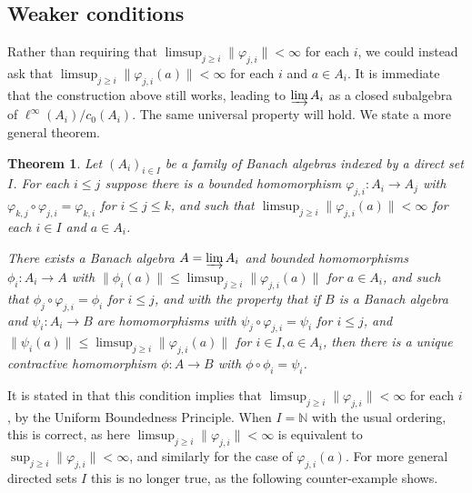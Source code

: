 \documentclass[a4paper,11pt]{article}
\newcommand{\indlim}{\varinjlim}
\newtheorem{theorem}[lemma]{Theorem}
\theoremstyle{definition}
\begin{document}
\subsection{Weaker conditions}

Rather than requiring that $\limsup_{j\geq i} \|\varphi_{j,i}\| < \infty$ for each $i$, we could
instead ask that $\limsup_{j\geq i} \|\varphi_{j,i}(a)\| < \infty$ for each $i$ and $a\in A_i$.
It is immediate that the construction above still works, leading to $\indlim A_i$ as a closed
subalgebra of $\ell^\infty(A_i) / c_0(A_i)$.  The same universal property will hold.  We state a
more general theorem.

\begin{theorem}
Let $(A_i)_{i\in I}$ be a family of Banach algebras indexed by a direct set $I$.  For each
$i\leq j$ suppose there is a bounded homomorphism $\varphi_{j,i}:A_i\rightarrow A_j$ with
$\varphi_{k,j} \circ \varphi_{j,i} = \varphi_{k,i}$ for $i\leq j\leq k$, and such that
$\limsup_{j\geq i} \|\varphi_{j,i}(a)\| < \infty$ for each $i\in I$ and $a\in A_i$.

There exists a Banach algebra $A=\indlim A_i$ and bounded homomorphisms $\phi_i:A_i\rightarrow
A$ with $\|\phi_i(a)\| \leq \limsup_{j\geq i} \|\varphi_{j,i}(a)\|$ for $a\in A_i$, and such that
$\phi_j \circ \varphi_{j,i} = \phi_i$ for $i\leq j$,
and with the property that if $B$ is a Banach algebra and
$\psi_i:A_i\rightarrow B$ are homomorphisms with $\psi_j \circ \varphi_{j,i} = \psi_i$ for
$i\leq j$, and
$\|\psi_i(a)\| \leq \limsup_{j\geq i} \|\varphi_{j,i}(a)\|$ for $i\in I, a\in A_i$, then there is
a unique contractive homomorphism $\phi:A\rightarrow B$ with $\phi\circ\phi_i = \psi_i$.
\end{theorem}

It is stated in \cite{blackadar, palmer} that this condition implies that  $\limsup_{j\geq i}
\|\varphi_{j,i}\| < \infty$ for each $i$, by the Uniform Boundedness Principle.  When $I=\mathbb N$
with the usual ordering, this is correct, as here $\limsup_{j\geq i} \|\varphi_{j,i}\| < \infty$
is equivalent to $\sup_{j\geq i} \|\varphi_{j,i}\| < \infty$, and similarly for the case of
$\varphi_{j,i}(a)$.  For more general directed sets $I$ this is no longer true, as the following
counter-example shows.
\end{document}
